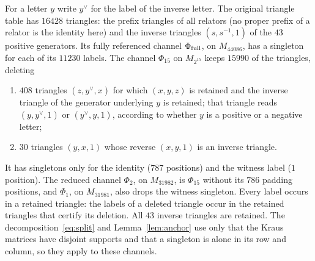 \documentclass[11pt]{article}
\begin{document}
For a letter $y$ write $y^\vee$ for the label of the inverse letter.  The original triangle table has $16428$ triangles: the prefix triangles of all relators (no proper prefix of a relator is the identity here) and the inverse triangles $(s,s^{-1},1)$ of the $43$ positive generators.  Its fully referenced channel $\Phi_{\rm full}$, on $M_{44086}$, has a singleton for each of its $11230$ labels.  The channel $\Phi_{15}$ on $M_{2^{15}}$ keeps $15990$ of the triangles, deleting
\begin{enumerate}[label=(\alph*)]
\item $408$ triangles $(z,y^\vee,x)$ for which $(x,y,z)$ is retained and the inverse triangle of the generator underlying $y$ is retained; that triangle reads $(y,y^\vee,1)$ or $(y^\vee,y,1)$, according to whether $y$ is a positive or a negative letter;
\item $30$ triangles $(y,x,1)$ whose reverse $(x,y,1)$ is an inverse triangle.
\end{enumerate}
It has singletons only for the identity ($787$ positions) and the witness label ($1$ position).  The reduced channel $\Phi_2$, on $M_{31982}$, is $\Phi_{15}$ without its $786$ padding positions, and $\Phi_1$, on $M_{31981}$, also drops the witness singleton.  Every label occurs in a retained triangle: the labels of a deleted triangle occur in the retained triangles that certify its deletion.  All $43$ inverse triangles are retained.  The decomposition~\eqref{eq:split} and Lemma~\ref{lem:anchor} use only that the Kraus matrices have disjoint supports and that a singleton is alone in its row and column, so they apply to these channels.
\end{document}
